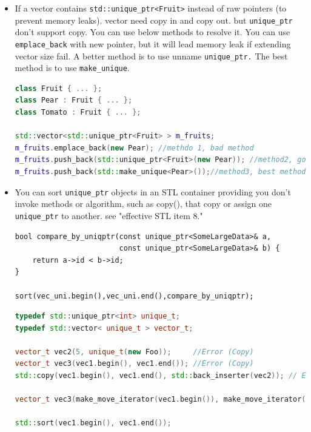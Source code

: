 \documentclass[a4paper,11pt,twoside]{book}
\begin{document}
\begin{itemize}
\item If a vector contains \texttt{std::unique\_ptr<Fruit>} instead of raw pointers (to prevent memory leaks). vector need copy in and copy out. but \texttt{unique\_ptr} don't support copy. You can use below methods to resolve it. You can use \texttt{emplace\_back} with new pointer, but it will lead memory leak if extending vector size fail. A better method is to use unname \texttt{unique\_ptr.} The best method is to use \texttt{make\_unique}.

\begin{lstlisting}[frame=single, language=c++]
class Fruit { ... };
class Pear : Fruit { ... };
class Tomato : Fruit { ... };

std::vector<std::unique_ptr<Fruit> > m_fruits;
m_fruits.emplace_back(new Pear); //methdo 1, bad method
m_fruits.push_back(std::unique_ptr<Fruit>(new Pear)); //method2, good method
m_fruits.push_back(std::make_unique<Pear>());//method3, best method 
\end{lstlisting}

\item You can sort \texttt{unique\_ptr} objects in an STL container providing you don't invoke methods or algorithm, such as copy(), that copy or assign one \texttt{unique\_ptr} to another.  see "effective STL item 8."

\begin{lstlisting}[numbers=none]
bool compare_by_uniqptr(const unique_ptr<SomeLargeData>& a,
                        const unique_ptr<SomeLargeData>& b) {
    return a->id < b->id;
}

sort(vec_uni.begin(),vec_uni.end(),compare_by_uniqptr);
\end{lstlisting}

\begin{lstlisting}[frame=single, language=c++]
typedef std::unique_ptr<int> unique_t;
typedef std::vector< unique_t > vector_t;

vector_t vec2(5, unique_t(new Foo));     //Error (Copy)
vector_t vec3(vec1.begin(), vec1.end()); //Error (Copy)
std::copy(vec1.begin(), vec1.end(), std::back_inserter(vec2)); // Error (copy)

vector_t vec3(make_move_iterator(vec1.begin()), make_move_iterator(vec1.end())); //Ok

std::sort(vec1.begin(), vec1.end());
\end{lstlisting}

\end{itemize}
\end{document}
